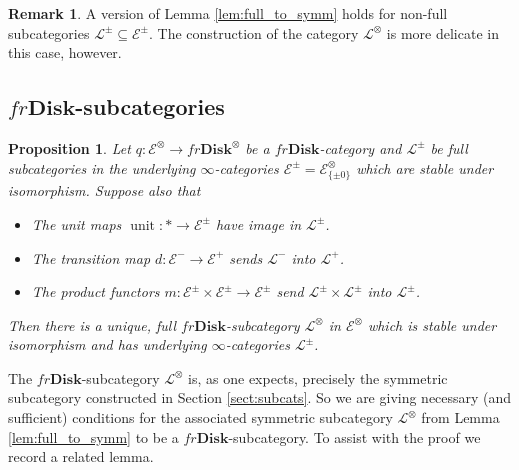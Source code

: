 \documentclass[reqno]{amsart}
\newtheorem{proposition}[lemma]{Proposition}
\theoremstyle{definition}
\newtheorem{remark}[lemma]{Remark}
\newcommand{\msc}[1]{\mathscr{#1}}
\newcommand{\opn}[1]{\operatorname{#1}}
\newcommand{\ot}{\otimes}
\newcommand{\Disk}{\mathbf{Disk}}
\renewcommand{\1}{\mathbf{1}}
\begin{document}
\begin{remark}
A version of Lemma \ref{lem:full_to_symm} holds for non-full subcategories $\msc{L}^{\pm}\subseteq \msc{E}^{\pm}$. The construction of the category $\msc{L}^{\ot}$ is more delicate in this case, however.
\end{remark}

\subsection{$fr\Disk$-subcategories}


\begin{proposition}\label{prop:frdisk_subcats}
Let $q:\msc{E}^{\ot}\to fr\Disk^{\ot}$ be a $fr\Disk$-category and $\msc{L}^{\pm}$ be full subcategories in the underlying $\infty$-categories $\msc{E}^{\pm}=\msc{E}^{\ot}_{\{\pm 0\}}$ which are stable under isomorphism. Suppose also that
\begin{itemize}
\item The unit maps $\opn{unit}:\ast\to \msc{E}^{\pm}$ have image in $\msc{L}^{\pm}$.\vspace{1mm}
\item The transition map $d:\msc{E}^-\to \msc{E}^+$ sends $\msc{L}^-$ into $\msc{L}^+$.\vspace{1mm}
\item The product functors $m:\msc{E}^{\pm}\times\msc{E}^{\pm}\to \msc{E}^{\pm}$ send $\msc{L}^{\pm}\times \msc{L}^{\pm}$ into $\msc{L}^{\pm}$.
\end{itemize}
Then there is a unique, full $fr\Disk$-subcategory $\msc{L}^{\ot}$ in $\msc{E}^{\ot}$ which is stable under isomorphism and has underlying $\infty$-categories $\msc{L}^{\pm}$.
\end{proposition}

The $fr\Disk$-subcategory $\msc{L}^{\ot}$ is, as one expects, precisely the symmetric subcategory constructed in Section \ref{sect:subcats}. So we are giving necessary (and sufficient) conditions for the associated symmetric subcategory $\msc{L}^{\ot}$ from Lemma \ref{lem:full_to_symm} to be a $fr\Disk$-subcategory. To assist with the proof we record a related lemma.
\end{document}
